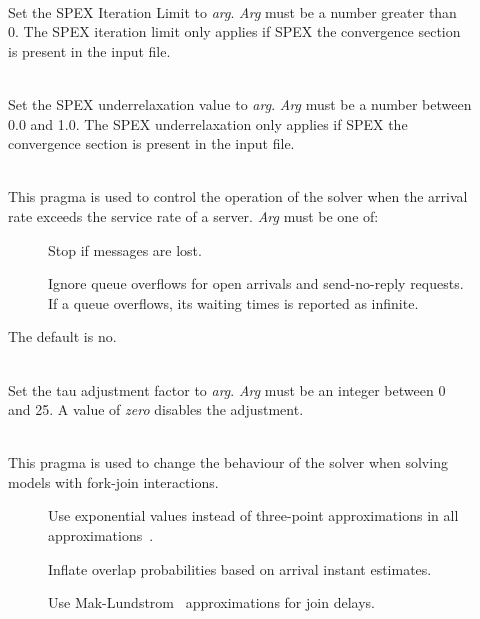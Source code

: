 \begin{description}
\item[]~\\
Set the SPEX Iteration Limit to \emph{arg}.  
\emph{Arg} must be a number greater than 0.
The SPEX iteration limit only applies if SPEX the convergence section is present in the input file.
\item[]~\\
Set the SPEX underrelaxation value to \emph{arg}.  
\emph{Arg} must be a number between 0.0 and 1.0.
The SPEX underrelaxation only applies if SPEX the convergence section is present in the input file.
\item[]~\\
This pragma is used to control the operation of the solver when the
arrival rate exceeds the service rate of a server.
\emph{Arg} must be one of: 
\begin{description}
\item[]
Stop if messages are lost.
\item[]
Ignore queue overflows for open arrivals and send-no-reply requests.  If a queue overflows, its waiting times is reported as infinite.\end{description}
The default is no.
\item[]~\\
Set the tau adjustment factor to \emph{arg}.
\emph{Arg} must be an integer between 0 and 25.
A value of \emph{zero} disables the adjustment.
\item[]~\\
This pragma is used to change the behaviour of the solver when solving
models with fork-join interactions.
\begin{description}
\item[]
Use exponential values instead of three-point approximations in all approximations~\cite{perf:jiang-96}.
\item[]
Inflate overlap probabilities based on arrival instant estimates.
\item[]
Use Mak-Lundstrom~\cite{perf:mak-90} approximations for join delays.
\item[]

\end{description}
\end{description}
